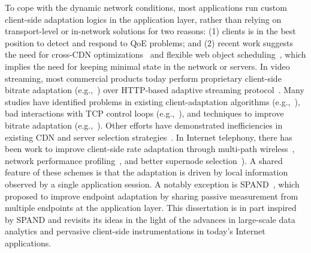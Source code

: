 To cope with the dynamic network conditions, 
most applications run custom client-side adaptation logics in
the application layer, rather than relying on transport-level or 
in-network solutions for two reasons:
(1) clients is in the best position to detect and respond to 
QoE problems; and 
(2) recent work suggests the need for cross-CDN 
optimizations~\cite{sigcomm12} and 
flexible web object scheduling~\cite{butkiewicz2015klotski},
which implies the need for keeping minimal state in the
network or servers.
In video streaming, most commercial products 
today perform proprietary client-side bitrate adaptation 
(e.g.,~\cite{SmoothStreaming,akamaihd,hls,netflix}) 
over HTTP-based adaptive streaming 
protocol~\cite{dash}.
Many studies have identified problems in existing
client-adaptation algorithms 
(e.g.,~\cite{mmsys2011cisco,de2010experimental}),
bad interactions with TCP control loops
(e.g.,~\cite{confused,usenix12_ghobadi}),
and techniques to improve bitrate adaptation 
(e.g.,~\cite{nossdav12_akhshabi,festive,panda}). 
Other efforts have demonstrated inefficiencies in existing 
CDN and server selection
strategies~\cite{youtubecdn,youtube-infra,sigcomm12,sigcomm12cdnmulti}.
In Internet telephony, there has been work to improve 
client-side rate adaptation through multi-path wireless~\cite{diversifi},
network performance profiling~\cite{sprout,de2008skype}, and 
better supernode selection~\cite{baset2004analysis,Skype-GI08}).
A shared feature of these schemes is that the adaptation is driven by
local information observed by a single application session.
A notably exception is SPAND~\cite{spand}, which proposed to improve 
endpoint adaptation by sharing passive measurement from multiple 
endpoints  at the application layer.
This dissertation is in part inspired by SPAND and revisits
its ideas in the light of the advances in large-scale data analytics
and pervasive client-side instrumentations in today's Internet 
applications.


